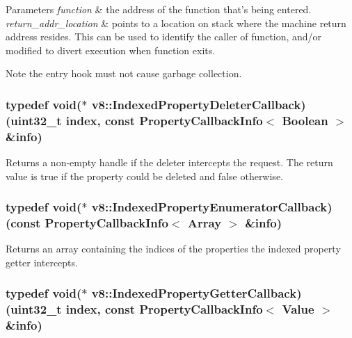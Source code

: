 \begin{DoxyParams}{Parameters}
{\em function} & the address of the function that's being entered. \\
\hline
{\em return\-\_\-addr\-\_\-location} & points to a location on stack where the machine return address resides. This can be used to identify the caller of {\ttfamily function}, and/or modified to divert execution when {\ttfamily function} exits.\\
\hline
\end{DoxyParams}
\begin{DoxyNote}{Note}
the entry hook must not cause garbage collection. 
\end{DoxyNote}
\hypertarget{namespacev8_a7418cfa2330fbb54371d5cb883f4f974}{
\subsubsection[{Indexed\-Property\-Deleter\-Callback}]{\setlength{\rightskip}{0pt plus 5cm}typedef void($\ast$ v8\-::\-Indexed\-Property\-Deleter\-Callback)(uint32\-\_\-t index, const {\bf Property\-Callback\-Info}$<$ {\bf Boolean} $>$ \&info)}}\label{namespacev8_a7418cfa2330fbb54371d5cb883f4f974}
Returns a non-\/empty handle if the deleter intercepts the request. The return value is true if the property could be deleted and false otherwise. \hypertarget{namespacev8_aa8e207afeba7b651331fd3a11624630a}{
\subsubsection[{Indexed\-Property\-Enumerator\-Callback}]{\setlength{\rightskip}{0pt plus 5cm}typedef void($\ast$ v8\-::\-Indexed\-Property\-Enumerator\-Callback)(const {\bf Property\-Callback\-Info}$<$ {\bf Array} $>$ \&info)}}\label{namespacev8_aa8e207afeba7b651331fd3a11624630a}
Returns an array containing the indices of the properties the indexed property getter intercepts. \hypertarget{namespacev8_a44546925ba002b2296a0ef25794003ef}{
\subsubsection[{Indexed\-Property\-Getter\-Callback}]{\setlength{\rightskip}{0pt plus 5cm}typedef void($\ast$ v8\-::\-Indexed\-Property\-Getter\-Callback)(uint32\-\_\-t index, const {\bf Property\-Callback\-Info}$<$ {\bf Value} $>$ \&info)}}\label{namespacev8_a44546925ba002b2296a0ef25794003ef}
